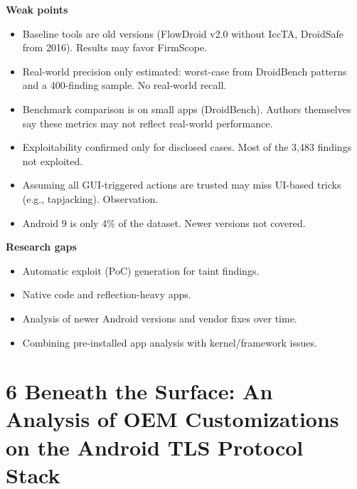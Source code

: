 \documentclass[11pt,a4paper]{article}
\begin{document}
\begin{enumerate}
    \vspace{4pt}
    \textbf{Weak points}
    \begin{itemize}
        \item Baseline tools are old versions (FlowDroid v2.0 without IccTA, DroidSafe from 2016). Results may favor FirmScope.
        \item Real-world precision only estimated: worst-case from DroidBench patterns and a 400-finding sample. No real-world recall.
        \item Benchmark comparison is on small apps (DroidBench). Authors themselves say these metrics may not reflect real-world performance.
        \item Exploitability confirmed only for disclosed cases. Most of the 3,483 findings not exploited.
        \item Assuming all GUI-triggered actions are trusted may miss UI-based tricks (e.g., tapjacking). Observation.
        \item Android 9 is only 4\% of the dataset. Newer versions not covered.
    \end{itemize}

    \vspace{4pt}
    \textbf{Research gaps}
    \begin{itemize}
        \item Automatic exploit (PoC) generation for taint findings.
        \item Native code and reflection-heavy apps.
        \item Analysis of newer Android versions and vendor fixes over time.
        \item Combining pre-installed app analysis with kernel/framework issues.
    \end{itemize}

\end{enumerate}

\newpage

\section{6 Beneath the Surface: An Analysis of OEM Customizations on the Android TLS Protocol Stack}
\end{document}
